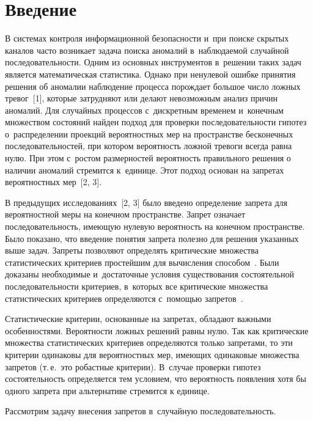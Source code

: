 \begin{multicols}{2}

\label{st\stat}

\section{Введение}

    В системах контроля информационной безопасности и~при поиске
скрытых каналов часто возникает задача поиска аномалий в~наблюдаемой
случайной последовательности. Одним из основных инструментов в~решении
таких задач является математическая статистика. Однако при ненулевой ошибке
принятия решения об аномалии наблюдение процесса порождает большое
число ложных тревог~[1], которые затрудняют или делают невозможным анализ
причин аномалий. Для случайных процессов с~дискретным временем
и~конечным множеством состояний найден подход для проверки
последовательности гипотез о~распределении проекций вероятностных мер на
пространстве бесконечных последовательностей, при котором вероятность
ложной тревоги всегда равна нулю. При этом с~ростом размерностей
вероятность правильного решения о наличии аномалий стремится к~единице.
Этот подход основан на запретах вероятностных мер~[2, 3].

    В предыдущих исследованиях~[2, 3] было введено определение запрета
для вероятностной меры на конечном пространстве. Запрет означает
последовательность, имеющую нулевую вероятность на конечном пространстве.
Было показано, что введение понятия запрета полезно для решения указанных
выше задач. Запреты позволяют определять критические множества
статистических критериев прос\-тей\-шим для вычисления способом~\cite{2-grs}.
Были доказаны необходимые и~достаточные условия существования
состоятельной последовательности критериев, в~которых все критические
множества статистических критериев определяются с~по\-мощью
запретов~\cite{3-grs}.

    Статистические критерии, основанные на запретах, обладают важными
особенностями. Вероятности ложных решений равны нулю. Так как
критические множества статистических критериев определяются только
запретами, то эти критерии одинаковы для вероятностных мер, име\-ющих
одинаковые множества запретов (т.\,е.\ это робастные критерии). В~случае
проверки гипотез состоятельность определяется тем условием, что вероятность
появления хотя бы одного запрета при альтернативе стремится к единице.

    Рассмотрим задачу внесения запретов в~случайную последовательность.


\end{multicols}
